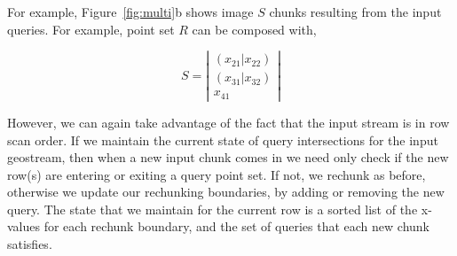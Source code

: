 \documentclass{vldb}
\begin{document}




For example, Figure~\ref{fig:multi}b shows image $S$ chunks
resulting from the input queries.  For example, point set $R$ can be
composed with,

\begin{equation}
S = \left| \begin{array}{c}
    (x_{21}|x_{22}) \\ 
    \hline 
    (x_{31}|x_{32}) \\ 
    \hline
    x_{41}
  \end{array}
\right|
\end{equation}

However, we can again take advantage of the fact that the input stream
is in row scan order.  If we maintain the current state of query
intersections for the input geostream, then when a new input chunk
comes in we need only check if the new row(s) are entering or exiting
a query point set.  If not, we rechunk as before, otherwise we update
our rechunking boundaries, by adding or removing the new query.  The
state that we maintain for the current row is a sorted list of the
x-values for each rechunk boundary, and the set of queries that each
new chunk satisfies.
\end{document}
